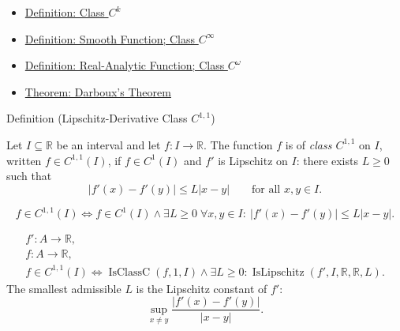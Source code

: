 \begin{dependencies}
\begin{itemize}
  \item \hyperref[def:class-ck]{Definition: Class \(C^k\)}
  \item \hyperref[def:class-cinfty]{Definition: Smooth Function; Class \(C^\infty\)}
  \item \hyperref[def:class-comega]{Definition: Real-Analytic Function; Class \(C^\omega\)}
  \item \hyperref[thm:darboux]{Theorem: Darboux's Theorem}
\end{itemize}
\end{dependencies}



\begin{definitionbox}{Definition (Lipschitz-Derivative Class \(C^{1,1}\))}
\begin{definition}
\label{def:class-c11}
Let \(I\subseteq\mathbb{R}\) be an interval and let \(f:I\to\mathbb{R}\).
The function \(f\) is of \emph{class \(C^{1,1}\)} on \(I\), written
\(f\in C^{1,1}(I)\), if \(f\in C^1(I)\) and \(f'\) is Lipschitz on \(I\):
there exists \(L\geq 0\) such that
\[
  |f'(x)-f'(y)|\leq L|x-y|
  \qquad\text{for all }x,y\in I.
\]
\end{definition}
\end{definitionbox}

\begin{remark*}
\[
  f\in C^{1,1}(I)
  \Longleftrightarrow
  f\in C^1(I)\land
  \exists L\geq 0\;\forall x,y\in I:\ |f'(x)-f'(y)|\leq L|x-y|.
\]
\end{remark*}

\begin{remark*}
\[
\begin{aligned}
  f'\colon A\to\mathbb{R},\\
  f\colon A\to\mathbb{R},\\
  f\in C^{1,1}(I)
  \Longleftrightarrow
  \operatorname{IsClassC}(f,1,I)\land
  \exists L\geq0:\operatorname{IsLipschitz}(f',I,\mathbb{R},\mathbb{R},L).
\end{aligned}
\]
The smallest admissible \(L\) is the Lipschitz constant of \(f'\):
\[
  \sup_{x\neq y}\frac{|f'(x)-f'(y)|}{|x-y|}.
\]
\end{remark*}

